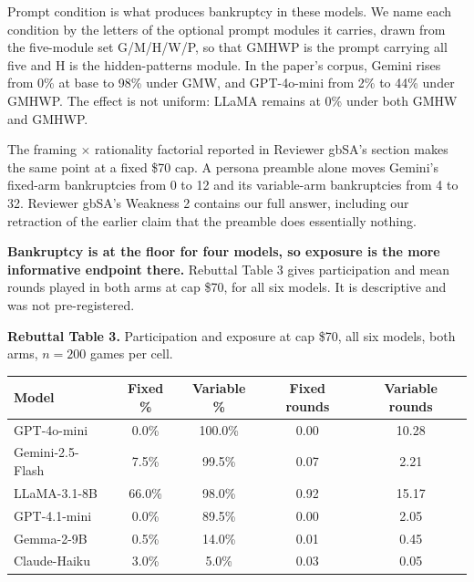 Prompt condition is what produces bankruptcy in these models. We name each condition by the letters
of the optional prompt modules it carries, drawn from the five-module set G/M/H/W/P, so that GMHWP
is the prompt carrying all five and H is the hidden-patterns module. In the paper's corpus, Gemini
rises from 0\% at base to 98\% under GMW, and GPT-4o-mini from 2\% to 44\% under GMHWP. The effect
is not uniform: LLaMA remains at 0\% under both GMHW and GMHWP.

The framing $\times$ rationality factorial reported in Reviewer gbSA's section makes the same point
at a fixed \$70 cap. A persona preamble alone moves Gemini's fixed-arm bankruptcies from 0 to 12 and
its variable-arm bankruptcies from 4 to 32. Reviewer gbSA's Weakness 2 contains our full answer,
including our retraction of the earlier claim that the preamble does essentially nothing.

\textbf{Bankruptcy is at the floor for four models, so exposure is the more informative endpoint
there.} Rebuttal Table 3 gives participation and mean rounds played in both arms at cap \$70, for
all six models. It is descriptive and was not pre-registered.

\vspace{0.6em}
\noindent\textbf{Rebuttal Table 3.} Participation and exposure at cap \$70, all six models, both
arms, $n = 200$ games per cell.

\vspace{0.3em}
\noindent
{\small
\begin{tabular}{lcccc}
\toprule
\textbf{Model} & \textbf{Fixed \%} & \textbf{Variable \%} & \textbf{Fixed rounds} & \textbf{Variable rounds} \\
\midrule
GPT-4o-mini      & 0.0\%  & 100.0\% & 0.00 & 10.28 \\
Gemini-2.5-Flash & 7.5\%  & 99.5\%  & 0.07 & 2.21 \\
LLaMA-3.1-8B     & 66.0\% & 98.0\%  & 0.92 & 15.17 \\
GPT-4.1-mini     & 0.0\%  & 89.5\%  & 0.00 & 2.05 \\
Gemma-2-9B       & 0.5\%  & 14.0\%  & 0.01 & 0.45 \\
Claude-Haiku     & 3.0\%  & 5.0\%   & 0.03 & 0.05 \\
\bottomrule
\end{tabular}
}

\vspace{0.3em}
\vspace{0.6em}


